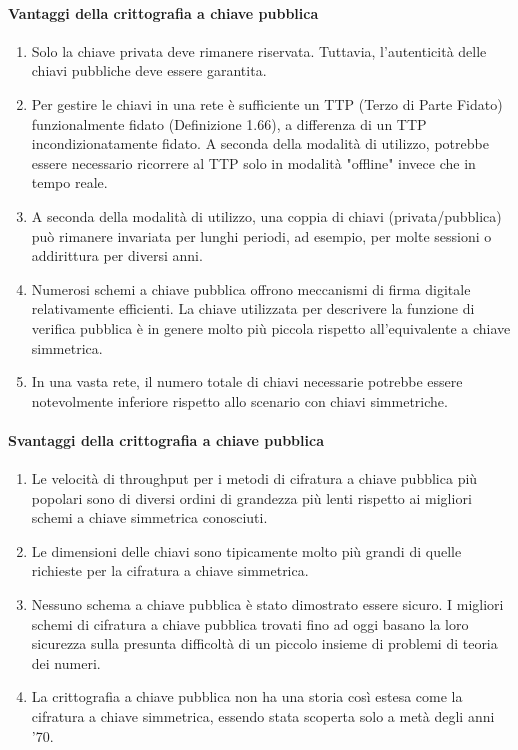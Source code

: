\documentclass{article}
\theoremstyle{definition}
\begin{document}
\paragraph{Vantaggi della crittografia a chiave pubblica}
\begin{enumerate}
    \item Solo la chiave privata deve rimanere riservata. Tuttavia, l'autenticità delle chiavi pubbliche deve essere garantita.
    
    \item Per gestire le chiavi in una rete è sufficiente un TTP (Terzo di Parte Fidato) funzionalmente fidato (Definizione 1.66), a differenza di un TTP incondizionatamente fidato. A seconda della modalità di utilizzo, potrebbe essere necessario ricorrere al TTP solo in modalità "offline" invece che in tempo reale.
    
    \item A seconda della modalità di utilizzo, una coppia di chiavi (privata/pubblica) può rimanere invariata per lunghi periodi, ad esempio, per molte sessioni o addirittura per diversi anni.
    
    \item Numerosi schemi a chiave pubblica offrono meccanismi di firma digitale relativamente efficienti. La chiave utilizzata per descrivere la funzione di verifica pubblica è in genere molto più piccola rispetto all'equivalente a chiave simmetrica.
    
    \item In una vasta rete, il numero totale di chiavi necessarie potrebbe essere notevolmente inferiore rispetto allo scenario con chiavi simmetriche.
\end{enumerate}

\paragraph{Svantaggi della crittografia a chiave pubblica}
\begin{enumerate}
    \item Le velocità di throughput per i metodi di cifratura a chiave pubblica più popolari sono di diversi ordini di grandezza più lenti rispetto ai migliori schemi a chiave simmetrica conosciuti.
    \item Le dimensioni delle chiavi sono tipicamente molto più grandi di quelle richieste per la cifratura a chiave simmetrica.
    \item Nessuno schema a chiave pubblica è stato dimostrato essere sicuro. I migliori schemi di cifratura a chiave pubblica trovati fino ad oggi basano la loro sicurezza sulla presunta difficoltà di un piccolo insieme di problemi di teoria dei numeri.
    \item La crittografia a chiave pubblica non ha una storia così estesa come la cifratura a chiave simmetrica, essendo stata scoperta solo a metà degli anni '70.
\end{enumerate}
\end{document}
